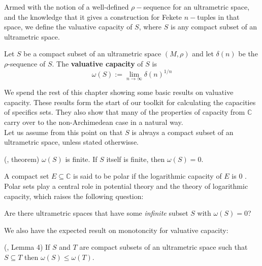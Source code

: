 Armed with the notion of a well-defined $\rho-$sequence for an ultrametric space, and the knowledge that it gives a construction for Fekete $n-$tuples in that space, we define the valuative capacity of $S$, where $S$ is any compact subset of an ultrametric space.

\begin{definition}
	\cite{kj}  Let $S$ be a compact subset of an ultrametric space $(M,\rho)$ and let $\delta(n)$ be the $\rho$-sequence of $S$. The \textbf{valuative capacity} of $S$ is \[\omega(S)
	:= \lim_{n\to\infty} \delta(n)^{1/n}\]  
\end{definition}

We spend the rest of this chapter showing some basic results on valuative capacity. These results form the start of our toolkit for calculating the capacities of specifics sets. They also show that many of the properties of capacity from $\mathbb{C}$ carry over to the non-Archimedean case in a natural way. \\

Let us assume from this point on that $S$ is always a compact subset of an ultrametric space, unless stated otherwisse. 

\begin{proposition}
	(\cite{kj}, theorem) $\omega(S)$ is finite. If $S$ itself is finite, then $\omega(S) =0$.
\end{proposition}

A compact set $E \subseteq \mathbb{C}$ is said to be polar if the logarithmic capacity of $E$ is $0$ \cite{rand}. Polar sets play a central role in potential theory and the theory of logarithmic capacity, which raises the following question:

\begin{question}
Are there ultrametric spaces that have some \textit{infinite} subset $S$ with $\omega(S)=0$?
\end{question}

We also have the expected result on monotoncity for valuative capacity:

\begin{proposition}
	(\cite{kj}, Lemma 4) If $S$ and $T$ are compact subsets of an ultrametric space such that $S \subseteq T$ then $\omega(S) \leq \omega(T)$. 
\end{proposition}


